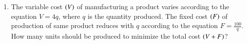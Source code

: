 \documentclass[journal]{IEEEtran}
\begin{document}
\begin{enumerate}[start=53]
\begin{enumerate}
\end{enumerate}
\item The variable cost $\left(V\right)$ of manufacturing a product varies according to the equation $V=4q$, where $q$ is the quantity produced. The fixed cost $\left(F\right)$ of production of same product reduces with $q$ according to the equation $F=\frac{100}{q}$. How many units should be produced to minimize the total cost $\left(V+F\right)$?
\begin{enumerate}
\end{enumerate}
\end{enumerate}
\end{document}
